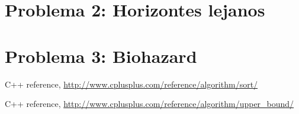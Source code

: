\documentclass[11pt,a4paper]{article}
\begin{document}
\thispagestyle{empty}
\maketitle
\tableofcontents



%

\newpage
\section{Problema 2: Horizontes lejanos}


\newpage
\section{Problema 3: Biohazard}


\newpage
\begin{thebibliography}{2}

  C++ reference,
  \url{http://www.cplusplus.com/reference/algorithm/sort/}
  
  C++ reference,
  \url{http://www.cplusplus.com/reference/algorithm/upper_bound/}

  
\end{thebibliography}
\end{document}
